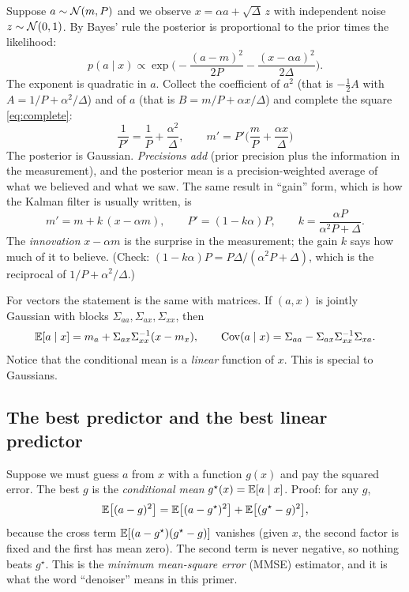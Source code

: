 Suppose $a\sim\mathcal{N}(m,P)$ and we observe $x=\alpha a+\sqrt\Delta\,z$ with independent noise $z\sim\mathcal{N}(0,1)$. By Bayes'
rule the posterior is proportional to the prior times the likelihood:
\[
  p(a\mid x)\propto\exp\!\Big(-\frac{(a-m)^2}{2P}-\frac{(x-\alpha a)^2}{2\Delta}\Big).
\]
The exponent is quadratic in $a$. Collect the coefficient of $a^2$ (that is $-\tfrac12A$ with $A=1/P+\alpha^2/\Delta$)
and of $a$ (that is $B=m/P+\alpha x/\Delta$) and complete the square \eqref{eq:complete}:
\begin{equation}\label{eq:precadd}
  \boxed{\;\frac{1}{P'}=\frac1P+\frac{\alpha^2}{\Delta},\qquad m'=P'\Big(\frac{m}{P}+\frac{\alpha x}{\Delta}\Big)\;}
\end{equation}
The posterior is Gaussian. \emph{Precisions add} (prior precision plus the information in the measurement),
and the posterior mean is a precision-weighted average of what we believed and what we saw. The same result
in ``gain'' form, which is how the Kalman filter is usually written, is
\begin{equation}\label{eq:gain}
  m'=m+k\,(x-\alpha m),\qquad P'=(1-k\alpha)P,\qquad k=\frac{\alpha P}{\alpha^2P+\Delta}.
\end{equation}
The \emph{innovation} $x-\alpha m$ is the surprise in the measurement; the gain $k$ says how much of it to
believe. (Check: $(1-k\alpha)P=P\Delta/(\alpha^2P+\Delta)$, which is the reciprocal of $1/P+\alpha^2/\Delta$.)

For vectors the statement is the same with matrices. If $(a,x)$ is jointly Gaussian with blocks
$\Sigma_{aa},\Sigma_{ax},\Sigma_{xx}$, then
\begin{equation}\label{eq:condmvn}
  \mathbb{E}[a\mid x]=m_a+\Sigma_{ax}\Sigma_{xx}^{-1}(x-m_x),\qquad \operatorname{Cov}(a\mid x)=\Sigma_{aa}-\Sigma_{ax}\Sigma_{xx}^{-1}\Sigma_{xa}.
\end{equation}
Notice that the conditional mean is a \emph{linear} function of $x$. This is special to Gaussians.

\subsection{The best predictor and the best linear predictor}\label{sec:mmse}

Suppose we must guess $a$ from $x$ with a function $g(x)$ and pay the squared error. The best $g$ is the
\emph{conditional mean} $g^\star(x)=\mathbb{E}[a\mid x]$. Proof: for any $g$,
\[
  \mathbb{E}\big[(a-g)^2\big]=\mathbb{E}\big[(a-g^\star)^2\big]+\mathbb{E}\big[(g^\star-g)^2\big],
\]
because the cross term $\mathbb{E}[(a-g^\star)(g^\star-g)]$ vanishes (given $x$, the second factor is fixed and the first
has mean zero). The second term is never negative, so nothing beats $g^\star$. This is the
\emph{minimum mean-square error} (MMSE) estimator, and it is what the word ``denoiser'' means in this primer.

